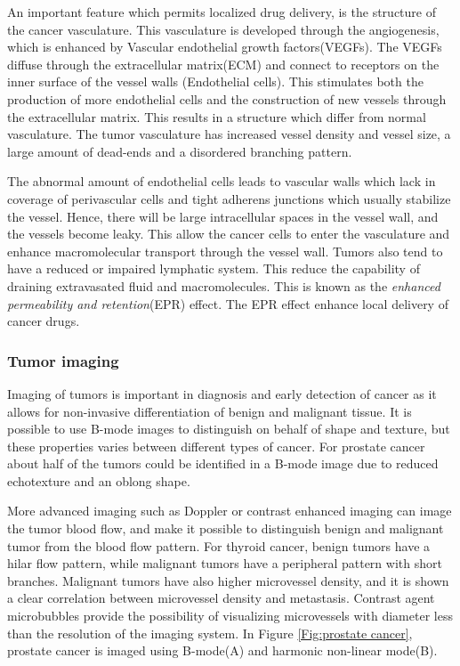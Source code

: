 An important feature which permits localized drug delivery, is the structure of the cancer vasculature. This vasculature is developed through the angiogenesis, which is enhanced by Vascular endothelial growth factors(VEGFs). The VEGFs diffuse through the extracellular matrix(ECM) and connect to receptors on the inner surface of the vessel walls (Endothelial cells)\cite{Koumoutsakos2013}. This stimulates both the production of more endothelial cells and the construction of new vessels through the extracellular matrix\cite{Nishida2006}. This results in a structure which differ from normal vasculature. The tumor vasculature has increased vessel density and vessel size, a large amount of dead-ends and a disordered branching pattern.    

The abnormal amount of endothelial cells leads to vascular walls which lack in coverage of perivascular cells and tight adherens junctions which usually stabilize the vessel. Hence, there will be large intracellular spaces in the vessel wall, and the vessels become leaky. This allow the cancer cells to enter the vasculature and enhance macromolecular transport through the vessel wall. Tumors also tend to have a reduced or impaired lymphatic system. This reduce the capability of draining extravasated fluid and macromolecules. This is known as the \textit{enhanced permeability and retention}(EPR) effect\cite{Matsumura1986}. The EPR effect enhance local delivery of cancer drugs.



\subsubsection{Tumor imaging}
Imaging of tumors is important in diagnosis and early detection of cancer as it allows for non-invasive differentiation of benign and malignant tissue. It is possible to use B-mode images to distinguish on behalf of shape and texture, but these properties varies between different types of cancer. For prostate cancer about half of the tumors could be identified in a B-mode image due to reduced echotexture and an oblong shape\cite{Halpern2006}. 

More advanced imaging such as Doppler or contrast enhanced imaging can image the tumor blood flow, and make it possible to distinguish benign and malignant tumor from the blood flow pattern. For thyroid cancer, benign tumors have a hilar flow pattern, while malignant tumors have a peripheral pattern with short branches\cite{Go2003}. Malignant tumors have also higher microvessel density, and it is shown a clear correlation between microvessel density and metastasis\cite{Rifkin1990}. Contrast agent microbubbles provide the possibility of visualizing microvessels with diameter less than the resolution of the imaging system. In Figure \ref{Fig:prostate cancer}, prostate cancer is imaged using B-mode(A) and harmonic non-linear mode(B).


